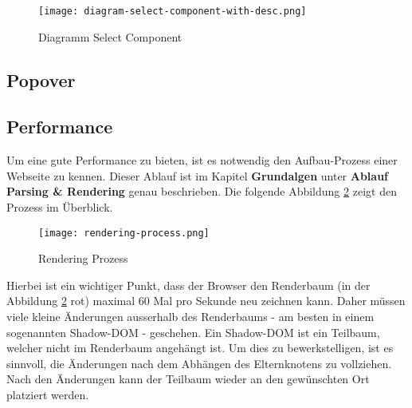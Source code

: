 \begin{figure}[!htb]
    \centering
    \texttt{[image: diagram-select-component-with-desc.png]}
    \caption{Diagramm Select Component}
    \label{Abbildung:DiagramSelectComponent}
\end{figure}

\subsection{Popover}




\subsection{Performance}

Um eine gute Performance zu bieten, ist es notwendig den Aufbau-Prozess einer Webseite zu kennen.
Dieser Ablauf ist im Kapitel \textbf{Grundalgen} unter \textbf{Ablauf Parsing \& Rendering} genau beschrieben.
Die folgende Abbildung \ref{Abbildung:RenderingProcessRecap} zeigt den Prozess im Überblick.

\begin{figure}[!htb]
    \centering
    \texttt{[image: rendering-process.png]}
    \caption{Rendering Prozess}
    \label{Abbildung:RenderingProcessRecap}
\end{figure}

Hierbei ist ein wichtiger Punkt, dass der Browser den Renderbaum (in der Abbildung \ref{Abbildung:RenderingProcessRecap} rot) maximal 60 Mal pro Sekunde neu zeichnen kann.
Daher müssen viele kleine Änderungen ausserhalb des Renderbaums - am besten in einem sogenannten Shadow-DOM - geschehen.
Ein Shadow-DOM ist ein Teilbaum, welcher nicht im Renderbaum angehängt ist.
Um dies zu bewerkstelligen, ist es sinnvoll, die Änderungen nach dem Abhängen des Elternknotens zu vollziehen. 
Nach den Änderungen kann der Teilbaum wieder an den gewünschten Ort platziert werden.

